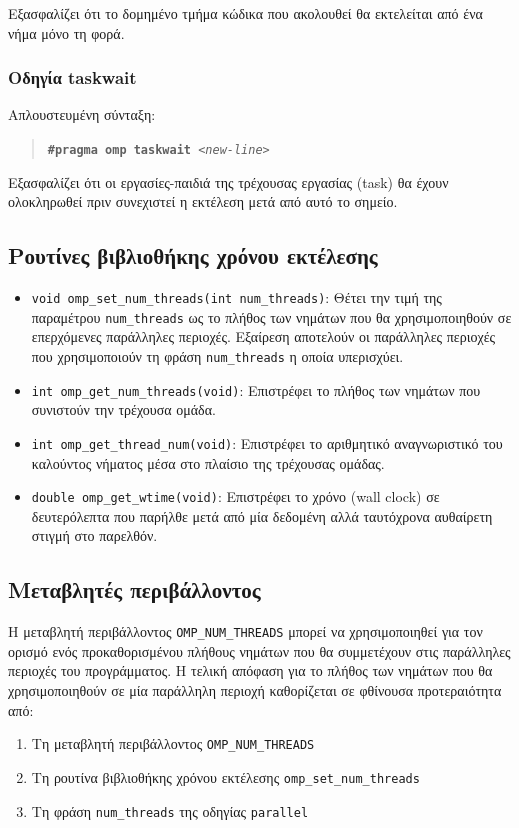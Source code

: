 Εξασφαλίζει ότι το δομημένο τμήμα κώδικα που ακολουθεί θα εκτελείται από ένα νήμα μόνο τη φορά.

\subsubsection{Οδηγία taskwait}
Απλουστευμένη σύνταξη:
\begin{quote}
	\texttt{\textbf{\#pragma omp taskwait} \textit{<new-line>}}
\end{quote}

Εξασφαλίζει ότι οι εργασίες-παιδιά της τρέχουσας εργασίας (task) θα έχουν ολοκληρωθεί πριν συνεχιστεί η εκτέλεση μετά από αυτό το σημείο.

\subsection{Ρουτίνες βιβλιοθήκης χρόνου εκτέλεσης}
\begin{itemize}
	\item \texttt{void omp\_set\_num\_threads(int num\_threads)}: Θέτει την τιμή της παραμέτρου \texttt{num\_threads} ως το πλήθος των νημάτων που θα χρησιμοποιηθούν σε επερχόμενες παράλληλες περιοχές. Εξαίρεση αποτελούν οι παράλληλες περιοχές που χρησιμοποιούν τη φράση \texttt{num\_threads} η οποία υπερισχύει.
	\item \texttt{int omp\_get\_num\_threads(void)}: Επιστρέφει το πλήθος των νημάτων που συνιστούν την τρέχουσα ομάδα.
	\item \texttt{int omp\_get\_thread\_num(void)}: Επιστρέφει το αριθμητικό αναγνωριστικό του καλούντος νήματος μέσα στο πλαίσιο της τρέχουσας ομάδας.
	\item \texttt{double omp\_get\_wtime(void)}: Επιστρέφει το χρόνο (wall clock) σε δευτερόλεπτα που παρήλθε μετά από μία δεδομένη αλλά ταυτόχρονα αυθαίρετη στιγμή στο παρελθόν.
\end{itemize}

\subsection{Μεταβλητές περιβάλλοντος}
Η μεταβλητή περιβάλλοντος \texttt{OMP\_NUM\_THREADS} μπορεί να χρησιμοποιηθεί για τον ορισμό ενός προκαθορισμένου πλήθους νημάτων που θα συμμετέχουν στις παράλληλες περιοχές του προγράμματος. Η τελική απόφαση για το πλήθος των νημάτων που θα χρησιμοποιηθούν σε μία παράλληλη περιοχή καθορίζεται σε φθίνουσα προτεραιότητα από:
\begin{enumerate}
	\item Τη μεταβλητή περιβάλλοντος \texttt{OMP\_NUM\_THREADS}
	\item Τη ρουτίνα βιβλιοθήκης χρόνου εκτέλεσης \texttt{omp\_set\_num\_threads}
	\item Τη φράση \texttt{num\_threads} της οδηγίας \texttt{parallel}
\end{enumerate}


